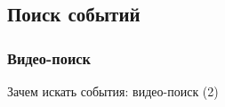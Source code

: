 \subsection{Поиск событий}




\subsubsection{Видео-поиск}

%
%
%

\begin{frame}{Зачем искать события: видео-поиск (2)}

\vspace{1.5em}



\end{frame}

